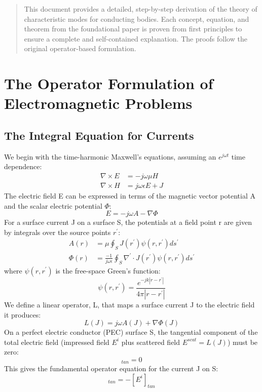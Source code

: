 \documentclass[11pt,a4paper]{article}
\begin{document}
\begin{abstract}
This document provides a detailed, step-by-step derivation of the theory of characteristic modes for conducting bodies. Each concept, equation, and theorem from the foundational paper is proven from first principles to ensure a complete and self-contained explanation. The proofs follow the original operator-based formulation.
\end{abstract}

\tableofcontents
\newpage

\section{The Operator Formulation of Electromagnetic Problems}
\subsection{The Integral Equation for Currents}

We begin with the time-harmonic Maxwell's equations, assuming an \(e^{j\omega t}\) time dependence:
\begin{align}
    \nabla\times E &= -j\omega\mu H \\
    \nabla\times H &= j\omega\epsilon E+J
\end{align}
The electric field E can be expressed in terms of the magnetic vector potential A and the scalar electric potential \(\Phi\):
\begin{equation}
    E=-j\omega A-\nabla\Phi
\end{equation}
For a surface current J on a surface S, the potentials at a field point r are given by integrals over the source points \(r^{\prime}\):
\begin{align}
    A(r) &= \mu\oint_{S}J(r^{\prime})\psi(r,r^{\prime})ds^{\prime} \\
    \Phi(r) &= \frac{-1}{j\omega\epsilon}\oint_{S}\nabla^{\prime}\cdot J(r^{\prime})\psi(r,r^{\prime})ds^{\prime}
\end{align}
where \(\psi(r,r^{\prime})\) is the free-space Green's function:
\begin{equation}
    \psi(r,r^{\prime})=\frac{e^{-jk|r-r^{\prime}|}}{4\pi|r-r^{\prime}|}
\end{equation}
We define a linear operator, L, that maps a surface current J to the electric field it produces:
\begin{equation}
    L(J)=j\omega A(J)+\nabla\Phi(J)
\end{equation}
On a perfect electric conductor (PEC) surface S, the tangential component of the total electric field (impressed field \(E^{i}\) plus scattered field \(E^{scat}=L(J)\)) must be zero:
\begin{equation}
    [E^{i}+L(J)]_{tan}=0
\end{equation}
This gives the fundamental operator equation for the current J on S:
\begin{equation}
    [L(J)]_{tan}=-[E^{i}]_{tan}
\end{equation}
\end{document}
